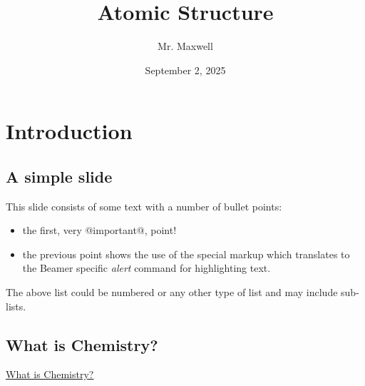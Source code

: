 \documentclass[11pt]{article}
\author{Mr. Maxwell}
\date{September 2, 2025}
\title{Atomic Structure}
\begin{document}
\maketitle


\section{Introduction}
\label{sec:orgfbd5351}
\subsection{A simple slide}
\label{sec:orgc16c6f1}
This slide consists of some text with a number of bullet points:

\begin{itemize}
\item the first, very @important@, point!
\item the previous point shows the use of the special markup which
translates to the Beamer specific \emph{alert} command for highlighting
text.
\end{itemize}


The above list could be numbered or any other type of list and may
include sub-lists.

\subsection{What is Chemistry?}
\label{sec:org7870f82}


\href{https://www.youtube.com/watch?v=NDPad7BIQpU\&pp=ygUeYnJlYWtpbmcgYmFkIHdoYXQgaXMgY2hlbWlzdHJ5}{What is Chemistry?}
\end{document}
